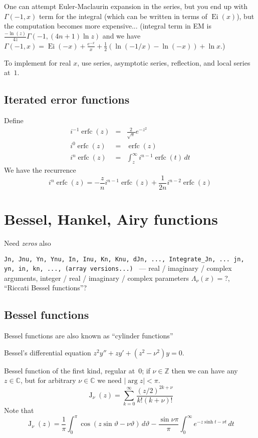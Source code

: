 \documentclass[10pt,dvipdfmx,letterpaper,twoside]{article}
\DeclareMathOperator{\erfc}{erfc}
\let\O=\operatorname
\newcommand{\CC}{{\mathbb{C}}}
\newcommand{\ZZ}{{\mathbb{Z}}}
\newenvironment{implementation}{\noindent\begin{framed}}{\end{framed}}
\let\Gam=\Gamma
\let\theta=\vartheta
\begin{document}
One can attempt Euler-Maclaurin expansion in the series, but you end up with $\Gam(-1,x)$ term for the integral (which can be written in terms of $\O{Ei}(x)$), but the
computation becomes more expensive... (integral term in EM is $\tfrac{-\ln(z)}{4z}\Gam(-1, (4n+1)\ln z)$
and we have $\Gam(-1,x) = \O{Ei}(-x) + \frac{e^{-x}}{x} + \frac12(\ln(-1/x) - \ln(-x)) + \ln x$.)

\begin{implementation}
To implement for real $x$, use series, asymptotic series, reflection, and local series at~$1$.
\end{implementation}


\subsection{Iterated error functions}
Define
\begin{eqnarray*}
i^{-1}\erfc(z) &=& \frac{2}{\sqrt\pi} e^{-z^2} \\
i^{0}\erfc(z) &=& \erfc(z) \\
i^{n}\erfc(z) &=& \int_z^\infty i^{n-1}\erfc(t)\,dt
\end{eqnarray*}
We have the recurrence
\[ i^{n}\erfc(z) = -\frac{z}{n}i^{n-1}\erfc(z) + \frac{1}{2n}i^{n-2}\erfc(z) \]

\section{Bessel, Hankel, Airy functions}

Need {\em zeros} also

{\tt Jn, Jnu, Yn, Ynu, In, Inu, Kn, Knu, dJn, ..., Integrate\_Jn, ...
jn, yn, in, kn, ..., (array versions...)
} --- real / imaginary / complex arguments, integer / real / imaginary / complex parameters
$\Lambda_\nu(x) = $?, ``Riccati Bessel functions''?

\subsection{Bessel functions}
Bessel functions are also known as ``cylinder functions''

Bessel's differential equation $z^2 y'' + z y' + (z^2-\nu^2) y = 0$.

Bessel function of the first kind, regular at~$0$; if $\nu\in\ZZ$ then we can have any $z\in\CC$, but
for arbitrary $\nu\in\CC$ we need $|\arg z|<\pi$.
\[ \O{J}_\nu(z) = \sum_{k=0}^\infty\frac{(z/2)^{2k+\nu}}{k!(k+\nu)!} \]
Note that
\[ \O{J}_\nu(z) = \frac{1}{\pi}\int_0^\pi\cos(z \sin\theta - \nu\theta)\,d\theta
  - \frac{\sin \nu\pi}{\pi}\int_0^\infty e^{-z \sinh t - \nu t}\,dt \]
\end{document}
